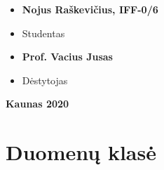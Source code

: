 \documentclass{article}
\begin{document}
\vspace{2.5cm}


\begin{changemargin}{7.5cm}{0cm}

    \begin{itemize}
        \item[]\large\textbf{Nojus Raškevičius, IFF-0/6}
        \vspace{0.2cm} 
        \item[]\large{Studentas}
    \end{itemize}

    \vspace{1cm}

    \begin{itemize}
        \item[]\large\textbf{Prof. Vacius Jusas}
        \vspace{0.2cm} 
        \item[]\large{Dėstytojas}
    \end{itemize}

\end{changemargin}

\vspace*{\fill}

\begin{center}
    \large\textbf{Kaunas 2020}
\end{center}

\pagebreak
\newpage


\tableofcontents

\newpage


\section{Duomenų klasė}
\end{document}

